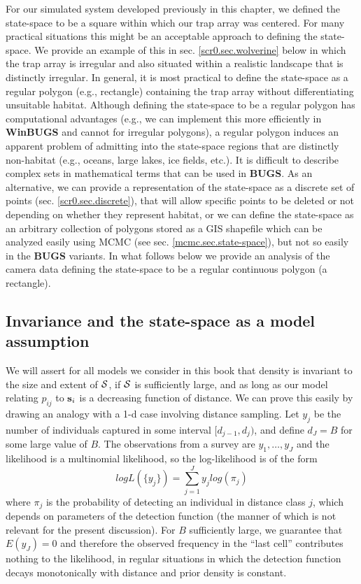 For our simulated system developed previously in this chapter, we
defined the state-space to be a square within which our trap array was
centered. For many practical situations this might be an
acceptable approach to defining the state-space. We provide an example
of this in sec. \ref{scr0.sec.wolverine} below in which the trap array is
irregular and also situated within a realistic landscape that is
distinctly irregular.  In general, it is most practical to define the
state-space as a regular polygon (e.g., rectangle) containing the trap
array without differentiating unsuitable habitat. Although defining
the state-space to be a regular polygon has computational advantages
(e.g., we can implement this more efficiently in {\bf WinBUGS} and
cannot for irregular polygons), a regular polygon induces an apparent
problem of admitting into the state-space regions that are distinctly
non-habitat (e.g., oceans, large lakes, ice fields, etc.).  It is
difficult to describe complex sets in mathematical terms that can be
used in {\bf BUGS}. As an alternative, we can provide a
representation of the state-space as a discrete set of points (sec.
\ref{scr0.sec.discrete}), that will allow specific points to be deleted
or not depending on whether they represent habitat, or we can define
the state-space as an arbitrary  collection of polygons stored as a GIS
shapefile
which can be analyzed easily using MCMC
(see sec. \ref{mcmc.sec.state-space}), but not so easily in the {\bf
  BUGS} variants.  In what follows below we provide an
analysis of the camera data defining the state-space to be a regular
continuous polygon (a rectangle).


\subsection{Invariance and the state-space as a model assumption}
\label{scr0.sec.invariance}

We will assert for all models we consider in this book that density is
invariant to the size and extent of ${\cal S}$, if ${\cal S}$ is
sufficiently large, and as long as our model relating $p_{ij}$ to
${\bf s}_{i}$ is a decreasing function of distance.  We can prove this
easily by drawing an analogy with a 1-d case involving distance
sampling.  Let $y_{j}$ be the number of individuals captured in some
interval $[d_{j-1},d_{j})$, and define $d_{J} = B$ for some large
value of $B$.  The observations from a survey are $y_{1},\ldots,y_J$
and the likelihood is a multinomial likelihood, so the log-likelihood
is of the form
\[
logL(\{ y_{j} \}) = \sum_{j=1}^{J} y_{j} log( \pi_{j} )
\]
where $\pi_{j}$ is the probability of detecting an individual in
distance class $j$, which depends on parameters of the detection
function (the manner of which is not relevant for the present
discussion).  For $B$ sufficiently large, we guarantee that $E(y_{J})
= 0$ and therefore the observed frequency in the ``last cell''
contributes nothing to the likelihood, in regular situations in which
the detection function decays monotonically with distance and prior
density is constant.


